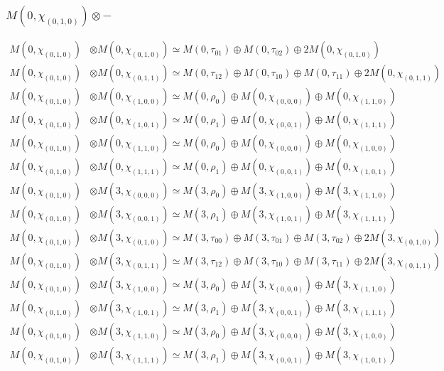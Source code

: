 \subsubsection{$ M(0,\chi_{(0,1,0)})\otimes -$}
\begin{align*}
M(0,\chi_{(0,1,0)}) &\otimes M(0,\chi_{(0,1,0)}) \simeq M(0,\tau_{01}) \oplus M(0,\tau_{02}) \oplus 2 M(0,\chi_{(0,1,0)}) \\
M(0,\chi_{(0,1,0)}) &\otimes M(0,\chi_{(0,1,1)}) \simeq M(0,\tau_{12}) \oplus M(0,\tau_{10}) \oplus M(0,\tau_{11}) \oplus 2 M(0,\chi_{(0,1,1)}) \\
M(0,\chi_{(0,1,0)}) &\otimes M(0,\chi_{(1,0,0)}) \simeq M(0,\rho_{0}) \oplus M(0,\chi_{(0,0,0)}) \oplus M(0,\chi_{(1,1,0)}) \\
M(0,\chi_{(0,1,0)}) &\otimes M(0,\chi_{(1,0,1)}) \simeq M(0,\rho_{1}) \oplus M(0,\chi_{(0,0,1)}) \oplus M(0,\chi_{(1,1,1)}) \\
M(0,\chi_{(0,1,0)}) &\otimes M(0,\chi_{(1,1,0)}) \simeq M(0,\rho_{0}) \oplus M(0,\chi_{(0,0,0)}) \oplus M(0,\chi_{(1,0,0)}) \\
M(0,\chi_{(0,1,0)}) &\otimes M(0,\chi_{(1,1,1)}) \simeq M(0,\rho_{1}) \oplus M(0,\chi_{(0,0,1)}) \oplus M(0,\chi_{(1,0,1)}) \\
M(0,\chi_{(0,1,0)}) &\otimes M(3,\chi_{(0,0,0)}) \simeq M(3,\rho_{0}) \oplus M(3,\chi_{(1,0,0)}) \oplus M(3,\chi_{(1,1,0)}) \\
M(0,\chi_{(0,1,0)}) &\otimes M(3,\chi_{(0,0,1)}) \simeq M(3,\rho_{1}) \oplus M(3,\chi_{(1,0,1)}) \oplus M(3,\chi_{(1,1,1)}) \\
M(0,\chi_{(0,1,0)}) &\otimes M(3,\chi_{(0,1,0)}) \simeq M(3,\tau_{00}) \oplus M(3,\tau_{01}) \oplus M(3,\tau_{02}) \oplus 2 M(3,\chi_{(0,1,0)}) \\
M(0,\chi_{(0,1,0)}) &\otimes M(3,\chi_{(0,1,1)}) \simeq M(3,\tau_{12}) \oplus M(3,\tau_{10}) \oplus M(3,\tau_{11}) \oplus 2 M(3,\chi_{(0,1,1)}) \\
M(0,\chi_{(0,1,0)}) &\otimes M(3,\chi_{(1,0,0)}) \simeq M(3,\rho_{0}) \oplus M(3,\chi_{(0,0,0)}) \oplus M(3,\chi_{(1,1,0)}) \\
M(0,\chi_{(0,1,0)}) &\otimes M(3,\chi_{(1,0,1)}) \simeq M(3,\rho_{1}) \oplus M(3,\chi_{(0,0,1)}) \oplus M(3,\chi_{(1,1,1)}) \\
M(0,\chi_{(0,1,0)}) &\otimes M(3,\chi_{(1,1,0)}) \simeq M(3,\rho_{0}) \oplus M(3,\chi_{(0,0,0)}) \oplus M(3,\chi_{(1,0,0)}) \\
M(0,\chi_{(0,1,0)}) &\otimes M(3,\chi_{(1,1,1)}) \simeq M(3,\rho_{1}) \oplus M(3,\chi_{(0,0,1)}) \oplus M(3,\chi_{(1,0,1)}) \\

\end{align*}
